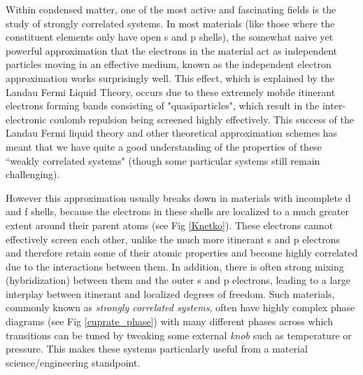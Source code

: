 \documentclass[10pt]{ruthesis}
\begin{document}

Within condensed matter, one of the most active and fascinating fields is the study of strongly correlated systems. In most materials (like those where the constituent elements only have open s and p shells), the somewhat naive yet powerful approximation that the electrons in the material act as independent particles moving in an effective medium, known as the independent electron approximation works surprisingly well. This effect, which is explained by the Landau Fermi Liquid Theory, occurs due to these extremely mobile itinerant electrons forming bands consisting of "quasiparticles", which result in the inter-electronic coulomb repulsion being screened highly effectively. This success of the Landau Fermi liquid theory and other theoretical approximation schemes has meant that we have quite a good understanding of the properties of these ``weakly correlated systems" (though some particular systems still remain challenging).

However this approximation usually breaks down in materials with incomplete d and f shells, because the electrons in these shells are localized to a much greater extent around their parent atoms (see Fig \ref{Knetko}). These electrons cannot effectively screen each other, unlike the much more itinerant s and p electrons and therefore retain some of their atomic properties and become highly correlated due to the interactions between them. In addition, there is often strong mixing (hybridization) between them and the outer s and p electrons, leading to a large interplay between itinerant and localized degrees of freedom. Such materials, commonly known as \textit{strongly correlated systems}, often have highly complex phase diagrams  (see Fig \ref{cuprate_phase}) with many different phases across which transitions can be tuned by tweaking some external \textit{knob} such as temperature or pressure. This makes these systems particularly useful from a material science/engineering standpoint.
\end{document}
